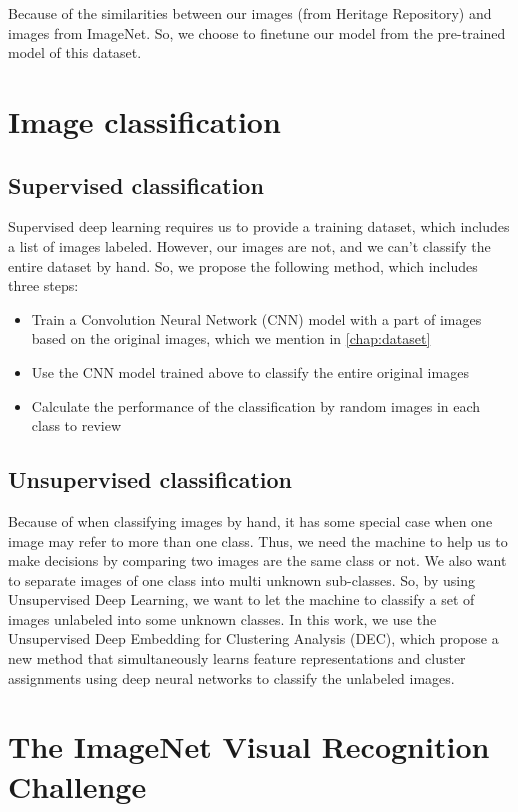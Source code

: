 \documentclass[hidelinks,12pt,a4paper]{report}
\begin{document}
Because of the similarities between our images (from Heritage Repository) and images from ImageNet. So, we choose to finetune our model from the pre-trained model of this dataset.

\section{Image classification}
\subsection{Supervised classification}
Supervised deep learning requires us to provide a training dataset, which includes a list of images labeled. However, our images are not, and we can't classify the entire dataset by hand. So, we propose the following method, which includes three steps:
\begin{itemize}
\item Train a Convolution Neural Network (CNN) model with a part of images based on the original images, which we mention in \autoref{chap:dataset}
\item Use the CNN model trained above to classify the entire original images
\item Calculate the performance of the classification by random images in each class to review

\end{itemize}


\subsection{Unsupervised classification}
Because of when classifying images by hand, it has some special case when one image may refer to more than one class. Thus, we need the machine to help us to make decisions by comparing two images are the same class or not. We also want to separate images of one class into multi unknown sub-classes. So, by using Unsupervised Deep Learning, we want to let the machine to classify a set of images unlabeled into some unknown classes. \newline\newline
In this work, we use the Unsupervised Deep Embedding for Clustering Analysis (DEC)\cite{DBLP:journals/corr/XieGF15}, which propose a new method that simultaneously learns feature representations and cluster assignments using deep neural networks to classify the unlabeled images.

\section{The ImageNet Visual Recognition Challenge}
\end{document}
